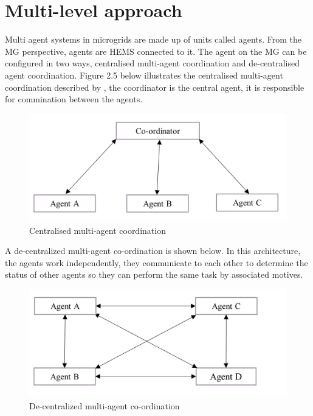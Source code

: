 \section{Multi-level approach}
Multi agent systems in microgrids are made up of units called agents. From the MG perspective, agents are HEMS connected to it. The agent on the MG can be configured in two ways, centralised multi-agent coordination and de-centralised agent coordination. Figure 2.5 below illustrates the centralised multi-agent coordination described by \cite{29}, the coordinator is the central agent, it is responsible for commination between the agents.\par
\begin{figure}[H]
	\centering
	\includegraphics[totalheight=6cm]{Figures/centralised multiagent.png}
	\caption{Centralised multi-agent coordination}
\end{figure}
A de-centralized multi-agent co-ordination is shown below. In this architecture, the agents work independently, they communicate to each other to determine the status of other agents so they can perform the same task by associated motives.\par
\begin{figure}[H]
	\centering
	\includegraphics[totalheight=6cm]{Figures/decentralised multiagent.png}
	\caption{De-centralized multi-agent co-ordination}
\end{figure}
